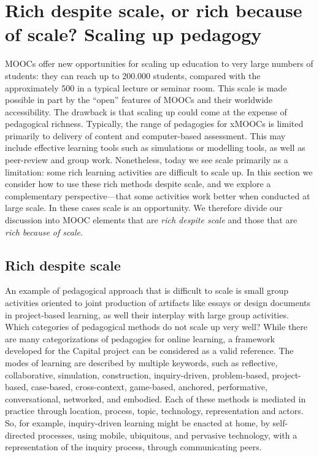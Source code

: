 \section{Rich despite scale, or rich because of scale?  Scaling up pedagogy}


MOOCs offer new opportunities for scaling up education to very large
numbers of students:
they can reach up to 200.000 students, compared with the approximately
500 in a typical lecture or seminar room.
This scale is made possible
in part by the ``open'' features of MOOCs and their worldwide
accessibility.
The drawback is that scaling up could come at the
expense of pedagogical richness. Typically, the range of pedagogies for
xMOOCs is limited primarily to delivery of content and computer-based
assessment. This may include effective learning tools such as
simulations or modelling tools, as well as peer-review and group
work. Nonetheless, today we see scale primarily as a limitation: some
rich learning 
activities are difficult to scale up. In this section we consider
how to use these rich methods despite scale, and we explore a
complementary perspective---that some activities work better when conducted at
large scale. In these cases scale is an opportunity.  We therefore
divide our discussion into MOOC elements that are \emph{rich despite
  scale} and those that are \emph{rich because of scale}.

\subsection{Rich despite scale}

An example of pedagogical approach that is difficult to scale is small
group activities oriented to joint production of artifacts like essays
or design documents in project-based learning, as well their interplay
with large group activities. Which categories of pedagogical methods do
not scale up very well? While there are many categorizations of
pedagogies for online learning, a framework developed for the Capital
project can be considered as a valid reference. The modes of learning
are described by multiple keywords, such as reflective, collaborative,
simulation, construction, inquiry-driven, problem-based, project-based,
case-based, cross-context, game-based, anchored, performative,
conversational, networked, and embodied. Each of these methods is
mediated in practice through location, process, topic, technology,
representation and actors. So, for example, inquiry-driven learning
might be enacted at home, by self-directed processes, using mobile,
ubiquitous, and pervasive technology, with a representation of the
inquiry process, through communicating peers.

